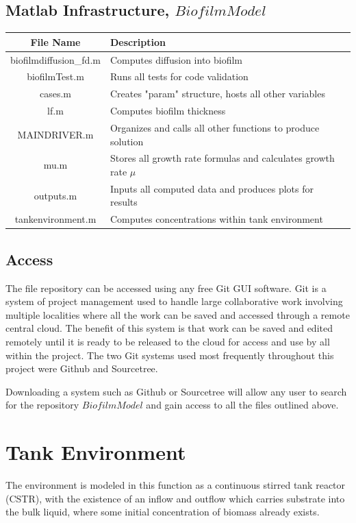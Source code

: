 \documentclass[letterpaper, twoside]{article}
\numberwithin{equation}{section}
\begin{document}
\subsection{Matlab Infrastructure, $BiofilmModel$}
\begin{tabular}{c l c}
  File Name & Description \\ \hline
  biofilmdiffusion\_fd.m & Computes diffusion into biofilm \\
  biofilmTest.m & Runs all tests for code validation \\
  cases.m & Creates "param" structure, hosts all other variables \\
  lf.m & Computes biofilm thickness \\
  MAINDRIVER.m & Organizes and calls all other functions to produce solution \\
  mu.m & Stores all growth rate formulas and calculates growth rate $\mu$ \\
  outputs.m & Inputs all computed data and produces plots for results \\
  tankenvironment.m & Computes concentrations within tank environment \\
\end{tabular}

\subsection{Access}
The file repository can be accessed using any free Git GUI software. Git is a system of project management used to handle large collaborative work involving multiple localities where all the work can be saved and accessed through a remote central cloud. The benefit of this system is that work can be saved and edited remotely until it is ready to be released to the cloud for access and use by all within the project. The two Git systems used most frequently throughout this project were Github and Sourcetree. 

Downloading a system such as Github or Sourcetree will allow any user to search for the repository $BiofilmModel$ and gain access to all the files outlined above. 
  
\section{Tank Environment}
The environment is modeled in this function as a continuous stirred tank reactor (CSTR), with the existence of an inflow and outflow which carries substrate into the bulk liquid, where some initial concentration of biomass already exists.
\end{document}
